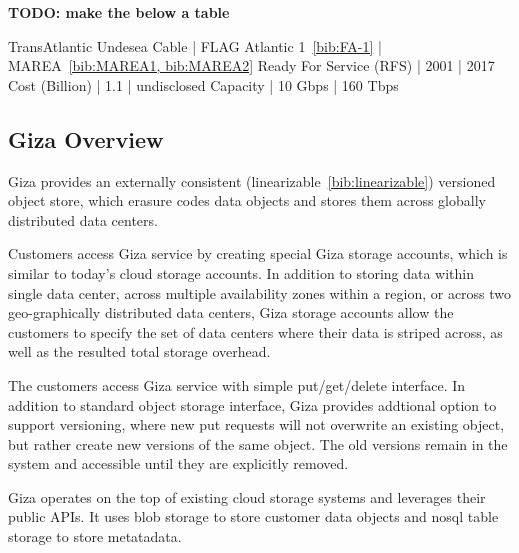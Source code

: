 {\bf TODO: make the below a table}

TransAtlantic Undesea Cable     | FLAG Atlantic 1~\ref{bib:FA-1}    | MAREA~\ref{bib:MAREA1, bib:MAREA2}
Ready For Service (RFS)         | 2001                              | 2017
Cost (Billion)                  | 1.1                               | undisclosed
Capacity                        | 10 Gbps                           | 160 Tbps


\subsection{Giza Overview}

Giza provides an externally consistent (linearizable~\ref{bib:linearizable}) versioned object store, which erasure codes data objects and stores them across globally distributed data centers.

Customers access Giza service by creating special Giza storage accounts, which is similar to today's cloud storage accounts. In addition to storing data within single data center, across multiple availability zones within a region, or across two geo-graphically distributed data centers, Giza storage accounts allow the customers to specify the set of data centers where their data is striped across, as well as the resulted total storage overhead.

The customers access Giza service with simple put/get/delete interface. In addition to standard object storage interface, Giza provides addtional option to support versioning, where new put requests will not overwrite an existing object, but rather create new versions of the same object. The old versions remain in the system and accessible until they are explicitly removed.

Giza operates on the top of existing cloud storage systems and leverages their public APIs. It uses blob storage to store customer data objects and nosql table storage to store metatadata.

